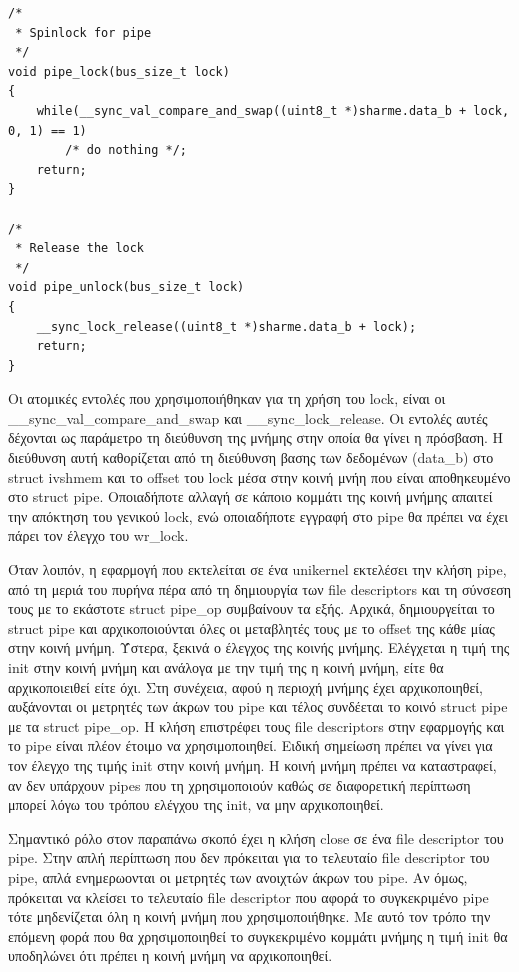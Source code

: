 \begin{lstlisting}
/*
 * Spinlock for pipe
 */
void pipe_lock(bus_size_t lock)
{
	while(__sync_val_compare_and_swap((uint8_t *)sharme.data_b + lock, 0, 1) == 1)
		/* do nothing */;
	return;
}

/*
 * Release the lock
 */
void pipe_unlock(bus_size_t lock)
{
	__sync_lock_release((uint8_t *)sharme.data_b + lock);
	return;
}

\end{lstlisting}

Οι ατομικές εντολές που χρησιμοποιήθηκαν για τη χρήση του lock, είναι οι
\_\_sync\_val\_compare\_and\_swap και \_\_sync\_lock\_release. Οι εντολές αυτές
δέχονται ως παράμετρο τη διεύθυνση της μνήμης στην οποία θα γίνει η πρόσβαση. Η
διεύθυνση αυτή καθορίζεται από τη διεύθυνση βασης των δεδομένων (data\_b) στο
struct ivshmem και το offset του lock μέσα στην κοινή μνήη που είναι
αποθηκευμένο στο struct pipe. Οποιαδήποτε αλλαγή σε κάποιο κομμάτι της κοινή
μνήμης απαιτεί την απόκτηση του γενικού lock, ενώ οποιαδήποτε εγγραφή στο pipe
θα πρέπει να έχει πάρει τον έλεγχο του wr\_lock.

Όταν λοιπόν, η εφαρμογή που εκτελείται σε ένα unikernel εκτελέσει την κλήση
pipe, από τη μεριά του πυρήνα πέρα από τη δημιουργία των file descriptors και τη
σύνσεση τους με το εκάστοτε struct pipe\_op συμβαίνουν τα εξής. Αρχικά,
δημιουργείται το struct pipe και αρχικοποιούνται όλες οι μεταβλητές τους με το
offset της κάθε μίας στην κοινή μνήμη. Ύστερα, ξεκινά ο έλεγχος της κοινής
μνήμης. Ελέγχεται η τιμή της init στην κοινή μνήμη και ανάλογα με την τιμή της η
κοινή μνήμη, είτε θα αρχικοποιειθεί είτε όχι. Στη συνέχεια, αφού η περιοχή
μνήμης έχει αρχικοποιηθεί, αυξάνονται οι μετρητές των άκρων του pipe και τέλος
συνδέεται το κοινό struct pipe με τα struct pipe\_op. Η κλήση επιστρέφει τους
file descriptors στην εφαρμογής και το pipe είναι πλέον έτοιμο να
χρησιμοποιηθεί. Ειδική σημείωση πρέπει να γίνει για τον έλεγχο της τιμής init
στην κοινή μνήμη. Η κοινή μνήμη πρέπει να καταστραφεί, αν δεν υπάρχουν pipes που
τη χρησιμοποιούν καθώς σε διαφορετική περίπτωση μπορεί λόγω του τρόπου ελέγχου
της init, να μην αρχικοποιηθεί. 

Σημαντικό ρόλο στον παραπάνω σκοπό έχει η κλήση close σε ένα file descriptor του
pipe. Στην απλή περίπτωση που δεν πρόκειται για το τελευταίο file descriptor του
pipe, απλά ενημερωονται οι μετρητές των ανοιχτών άκρων του pipe. Αν όμως,
πρόκειται να κλείσει το τελευταίο file descriptor που αφορά το συγκεκριμένο pipe
τότε μηδενίζεται όλη η κοινή μνήμη που χρησιμοποιήθηκε. Με αυτό τον τρόπο την
επόμενη φορά που θα χρησιμοποιηθεί το συγκεκριμένο κομμάτι μνήμης η τιμή init θα
υποδηλώνει ότι πρέπει η κοινή μνήμη να αρχικοποιηθεί. 


